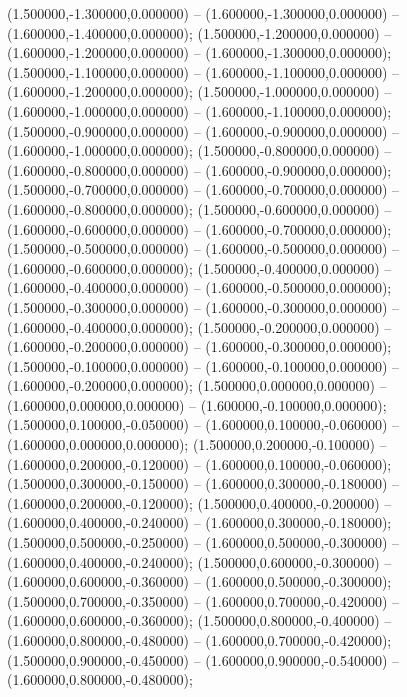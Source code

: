  (1.500000,-1.300000,0.000000) -- (1.600000,-1.300000,0.000000) -- (1.600000,-1.400000,0.000000);
 (1.500000,-1.200000,0.000000) -- (1.600000,-1.200000,0.000000) -- (1.600000,-1.300000,0.000000);
 (1.500000,-1.100000,0.000000) -- (1.600000,-1.100000,0.000000) -- (1.600000,-1.200000,0.000000);
 (1.500000,-1.000000,0.000000) -- (1.600000,-1.000000,0.000000) -- (1.600000,-1.100000,0.000000);
 (1.500000,-0.900000,0.000000) -- (1.600000,-0.900000,0.000000) -- (1.600000,-1.000000,0.000000);
 (1.500000,-0.800000,0.000000) -- (1.600000,-0.800000,0.000000) -- (1.600000,-0.900000,0.000000);
 (1.500000,-0.700000,0.000000) -- (1.600000,-0.700000,0.000000) -- (1.600000,-0.800000,0.000000);
 (1.500000,-0.600000,0.000000) -- (1.600000,-0.600000,0.000000) -- (1.600000,-0.700000,0.000000);
 (1.500000,-0.500000,0.000000) -- (1.600000,-0.500000,0.000000) -- (1.600000,-0.600000,0.000000);
 (1.500000,-0.400000,0.000000) -- (1.600000,-0.400000,0.000000) -- (1.600000,-0.500000,0.000000);
 (1.500000,-0.300000,0.000000) -- (1.600000,-0.300000,0.000000) -- (1.600000,-0.400000,0.000000);
 (1.500000,-0.200000,0.000000) -- (1.600000,-0.200000,0.000000) -- (1.600000,-0.300000,0.000000);
 (1.500000,-0.100000,0.000000) -- (1.600000,-0.100000,0.000000) -- (1.600000,-0.200000,0.000000);
 (1.500000,0.000000,0.000000) -- (1.600000,0.000000,0.000000) -- (1.600000,-0.100000,0.000000);
 (1.500000,0.100000,-0.050000) -- (1.600000,0.100000,-0.060000) -- (1.600000,0.000000,0.000000);
 (1.500000,0.200000,-0.100000) -- (1.600000,0.200000,-0.120000) -- (1.600000,0.100000,-0.060000);
 (1.500000,0.300000,-0.150000) -- (1.600000,0.300000,-0.180000) -- (1.600000,0.200000,-0.120000);
 (1.500000,0.400000,-0.200000) -- (1.600000,0.400000,-0.240000) -- (1.600000,0.300000,-0.180000);
 (1.500000,0.500000,-0.250000) -- (1.600000,0.500000,-0.300000) -- (1.600000,0.400000,-0.240000);
 (1.500000,0.600000,-0.300000) -- (1.600000,0.600000,-0.360000) -- (1.600000,0.500000,-0.300000);
 (1.500000,0.700000,-0.350000) -- (1.600000,0.700000,-0.420000) -- (1.600000,0.600000,-0.360000);
 (1.500000,0.800000,-0.400000) -- (1.600000,0.800000,-0.480000) -- (1.600000,0.700000,-0.420000);
 (1.500000,0.900000,-0.450000) -- (1.600000,0.900000,-0.540000) -- (1.600000,0.800000,-0.480000);
